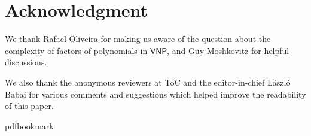 \documentclass[11pt]{article}
\numberwithin{equation}{section}
\theoremstyle{definition}
\theoremstyle{plain}
\newcommand{\ComplexityFont}[1]{{\ensuremath{\mathsf{#1}}}}
\newcommand{\VNP}{\ComplexityFont{VNP}}
\begin{document}
\section*{Acknowledgment}
We thank Rafael Oliveira for making us aware of the question about the complexity of factors of polynomials in $\VNP$, and Guy Moshkovitz for helpful discussions. 


We also thank the anonymous reviewers at ToC and the editor-in-chief L{\'a}szl{\'o} Babai for various comments and suggestions which helped improve the readability of this paper. 

\nocite{kalt85,Kal86,Kal87,k89}
\nocite{lidl}
\nocite{sy}


\providecommand{\bibhead}[1]{}
\expandafter\ifx\csname pdfbookmark\endcsname\relax%
  \providecommand{\tocrefpdfbookmark}{}
\else\providecommand{\tocrefpdfbookmark}{%
   \hypertarget{tocreferences}{}%
   \pdfbookmark[1]{References}{tocreferences}}%
\fi
\end{document}
